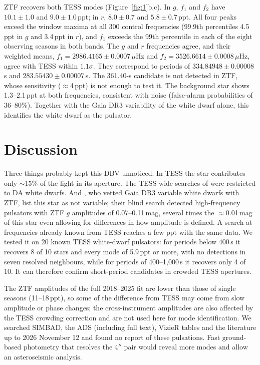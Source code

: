 \documentclass[RNAAS]{aastex631}
\begin{document}
ZTF recovers both TESS modes (Figure~\ref{fig:1}b,c). In $g$, $f_1$ and $f_2$ have $10.1\pm1.0$ and $9.0\pm1.0$\,ppt;
in $r$, $8.0\pm0.7$ and $5.8\pm0.7$\,ppt. All four peaks exceed the window maxima at all 300 control frequencies
(99.9th percentiles 4.5\,ppt in $g$ and 3.4\,ppt in $r$), and $f_1$ exceeds the 99th percentile in each of the eight
observing seasons in both bands. The $g$ and $r$ frequencies agree, and their weighted means,
$f_1=2986.4165\pm0.0007\,\mu$Hz and $f_2=3526.6614\pm0.0008\,\mu$Hz, agree with TESS within $1.1\sigma$. They correspond
to periods of $334.84948\pm0.00008$\,s and $283.55430\pm0.00007$\,s. The 361.40-s candidate is not detected in ZTF, whose
sensitivity ($\approx$4\,ppt) is not enough to test it. The background star shows 1.3--2.1\,ppt at both frequencies,
consistent with noise (false-alarm probabilities of 36--80\%). Together with the Gaia DR3 variability of the white
dwarf alone, this identifies the white dwarf as the pulsator.

\section{Discussion}
Three things probably kept this DBV unnoticed. In TESS the star contributes only $\sim$15\% of the light in its aperture.
The TESS-wide searches of \citet{romero2022,romero2025} were restricted to DA white dwarfs. And \citet{jestin2026},
who vetted Gaia DR3 variable white dwarfs with ZTF, list this star as not variable; their blind search detected
high-frequency pulsators with ZTF $g$ amplitudes of 0.07--0.11\,mag, several times the $\approx$0.01\,mag of this star
even allowing for differences in how amplitude is defined. A search at frequencies
already known from TESS reaches a few ppt with the same data. We tested it on 20 known TESS white-dwarf pulsators: for
periods below 400\,s it recovers 8 of 10 stars and every mode of 5.9\,ppt or more, with no detections in seven resolved
neighbours, while for periods of 400--1{,}000\,s it recovers only 4 of 10. It can therefore confirm short-period
candidates in crowded TESS apertures.

The ZTF amplitudes of the full 2018--2025 fit are lower than those of single seasons (11--18\,ppt), so some of the
difference from TESS may come from slow amplitude or phase changes; the cross-instrument amplitudes are also affected
by the TESS crowding correction and are not used here for mode identification. We searched SIMBAD, the ADS
(including full text), VizieR tables \citep{guidry2021,jestin2026} and the literature up to 2026 November 12 and found
no report of these pulsations. Fast ground-based photometry that resolves the 4$''$ pair would reveal more modes and
allow an asteroseismic analysis.
\end{document}
